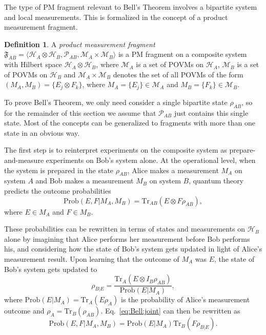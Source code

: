 \documentclass[DIV=calc,fontsize=12pt]{scrartcl} %
\theoremstyle{definition}
\newtheorem{definition}{Definition}[section]
\theoremstyle{plain}
\newcommand{\Hilb}[1][]{\ensuremath{\mathcal{H}_{#1}}}
\newcommand{\Tr}[2][]{\ensuremath{\text{Tr}_{#1} \left ( #2 \right )}}
\begin{document}
The type of PM fragment relevant to Bell's Theorem involves a
bipartite system and local measurements.  This is formalized in the
concept of a product measurement fragment.
\begin{definition}
\label{def:Bell:PM}
A \emph{product measurement fragment} $\mathfrak{F}_{AB} = \langle
\Hilb[A] \otimes \Hilb[B], \mathcal{P}_{AB}, \mathcal{M}_A \times
\mathcal{M}_B \rangle$ is a PM fragment on a composite system with
Hilbert space $\Hilb[A] \otimes \Hilb[B]$, where $\mathcal{M}_A$ is
a set of POVMs on $\Hilb[A]$, $\mathcal{M}_B$ is a set of POVMs on
$\Hilb[B]$ and $\mathcal{M}_A \times \mathcal{M}_B$ denotes the set
of all POVMs of the form $(M_A,M_B) = \{E_j \otimes F_k\}$, where
$M_A = \{E_j\} \in \mathcal{M}_A$ and $M_B = \{F_k\} \in
\mathcal{M}_B$.
\end{definition}

To prove Bell's Theorem, we only need consider a single bipartite
state $\rho_{AB}$, so for the remainder of this section we assume that
$\mathcal{P}_{AB}$ just contains this single state.  Most of the
concepts can be generalized to fragments with more than one state in
an obvious way.

The first step is to reinterpret experiments on the composite system
as prepare-and-measure experiments on Bob's system alone.  At the
operational level, when the system is prepared in the state
$\rho_{AB}$, Alice makes a measurement $M_A$ on system $A$ and Bob
makes a measurement $M_B$ on system $B$, quantum theory predicts the
outcome probabilities
\begin{equation}
\label{eq:Bell:joint}
\text{Prob}(E,F|M_A,M_B) =  \Tr[AB]{E \otimes F
\rho_{AB}},
\end{equation}
where $E \in M_A$ and $F \in M_B$.

These probabilities can be rewritten in terms of states and
measurements on $\Hilb[B]$ alone by imagining that Alice performs her
measurement before Bob performs his, and considering how the state of
Bob's system gets updated in light of Alice's measurement result.
Upon learning that the outcome of $M_A$ was $E$, the state of Bob's
system gets updated to
\begin{equation}
\label{eq:Bell:condstate}
\rho_{B|E} = \frac{\Tr[A]{E \otimes I_B
\rho_{AB}}}{\text{Prob}(E|M_A)},
\end{equation}
where $\text{Prob}(E|M_A) = \Tr[A]{E \rho_{A}}$ is the probability
of Alice's measurement outcome and $\rho_A = \Tr[B]{\rho_{AB}}$.
Eq.~\eqref{eq:Bell:joint} can then be rewritten as
\begin{equation}
\text{Prob}(E,F|M_A,M_B) = \text{Prob}(E|M_A) \Tr[B]{F
\rho_{B|E}}.
\end{equation}
\end{document}
